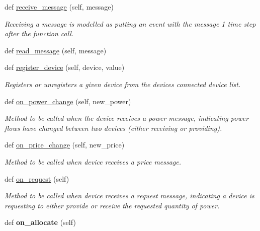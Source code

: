 \begin{DoxyCompactItemize}
\mbox{\label{class_device_1_1_device_ab19f8e64e8a68ecd5316db800db01d46}} 
def \hyperlink{class_device_1_1_device_ab19f8e64e8a68ecd5316db800db01d46}{receive\+\_\+message} (self, message)
\begin{DoxyCompactList}\small\item\em Receiving a message is modelled as putting an event with the message 1 time step after the function call. \end{DoxyCompactList}\item 
def \hyperlink{class_device_1_1_device_a1d4ccc0c3994e92d6c0cc22b0484801e}{read\+\_\+message} (self, message)
\item 
def \hyperlink{class_device_1_1_device_adc0a8678e0a0889ab254061e378be6fe}{register\+\_\+device} (self, device, value)
\begin{DoxyCompactList}\small\item\em Registers or unregisters a given device from the device\textquotesingle{}s connected device list. \end{DoxyCompactList}\item 
def \hyperlink{class_device_1_1_device_ac8cec0e5eee2635bc306f765e60c2f9c}{on\+\_\+power\+\_\+change} (self, new\+\_\+power)
\begin{DoxyCompactList}\small\item\em Method to be called when the device receives a power message, indicating power flows have changed between two devices (either receiving or providing). \end{DoxyCompactList}\item 
def \hyperlink{class_device_1_1_device_a2e57c6f8bccdf4644b7332284651e120}{on\+\_\+price\+\_\+change} (self, new\+\_\+price)
\begin{DoxyCompactList}\small\item\em Method to be called when device receives a price message. \end{DoxyCompactList}\item 
def \hyperlink{class_device_1_1_device_a5261b7396dd1581d649d629fccf3029c}{on\+\_\+request} (self)
\begin{DoxyCompactList}\small\item\em Method to be called when device receives a request message, indicating a device is requesting to either provide or receive the requested quantity of power. \end{DoxyCompactList}\item 
\mbox{\label{class_device_1_1_device_a329080b5f36e73fe6b37096f408b07b7}} 
def {\bfseries on\+\_\+allocate} (self)
\end{DoxyCompactItemize}



